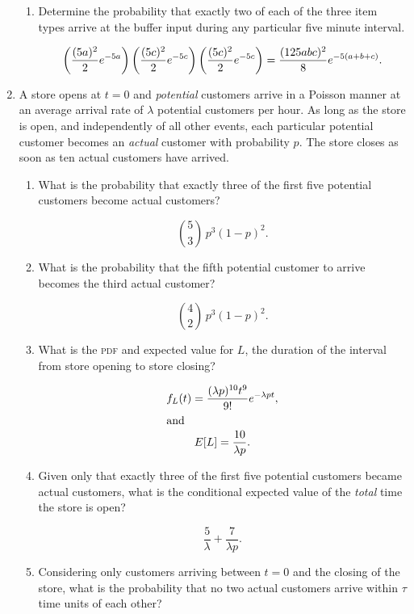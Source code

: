 \begin{enumerate}
\begin{enumerate}
  \item Determine the probability that exactly two of each of the
    three item types arrive at the buffer input during any particular
    five minute interval.

    \[\left( \frac{(5a)^2}{2} e^{-5a} \right)\left( \frac{(5c)^2}{2} e^{-5c} \right)\left( \frac{(5c)^2}{2} e^{-5c} \right) = \frac{(125abc)^2}{8} e^{-5(a+b+c)}.\]
  \end{enumerate}

\item A store opens at \(t = 0\) and \emph{potential} customers arrive
  in a Poisson manner at an average arrival rate of \(λ\) potential
  customers per hour.  As long as the store is open, and independently
  of all other events, each particular potential customer becomes an
  \emph{actual} customer with probability \(p\).  The store closes as
  soon as ten actual customers have arrived.
  \begin{enumerate}
  \item What is the probability that exactly three of the first five
    potential customers become actual customers?

    \[\binom53 \, p^3 (1-p)^2.\]

  \item What is the probability that the fifth potential customer to
    arrive becomes the third actual customer?

    \[\binom42 \, p^3 (1-p)^2.\]

  \item What is the \textsc{pdf} and expected value for \(L\), the
    duration of the interval from store opening to store closing?

    \begin{gather*}
      f_L(t) = \frac{(\lambda p)^{10} t^9}{9!} e^{-\lambda p t}, \\
      \intertext{and}
      E[L] = \frac{10}{\lambda p}.
    \end{gather*}

  \item Given only that exactly three of the first five potential
    customers became actual customers, what is the conditional
    expected value of the \emph{total} time the store is open?

    \[\frac{5}{λ} + \frac{7}{λp}.\]
    
  \item Considering only customers arriving between \(t = 0\) and the
    closing of the store, what is the probability that no two actual
    customers arrive within \(τ\) time units of each other?


\end{enumerate}
\end{enumerate}

